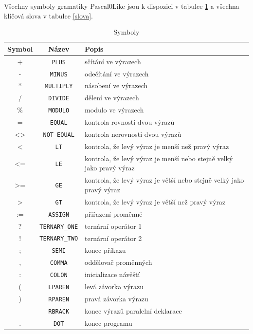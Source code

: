 \documentclass[
12pt,
a4paper,
pdftex,
czech,
titlepage
]{report}
\begin{document}
Všechny symboly gramatiky Pascal0Like jsou k dispozici v tabulce \ref{symboly} a všechna klíčová slova v tabulce \ref{slova}.

\begin{longtable}{|c|c|p{8cm}|}
\caption{Symboly}
\label{symboly}
\endfirsthead
\endhead
\hline
		\textbf{Symbol} & \textbf{Název} & \textbf{Popis} \\
\hline
+ & \texttt{PLUS} & sčítání ve výrazech \\ \hline
- & \texttt{MINUS} & odečítání ve výrazech \\ \hline
* & \texttt{MULTIPLY} & násobení ve výrazech \\ \hline
/ & \texttt{DIVIDE} & dělení ve výrazech \\ \hline
\% & \texttt{MODULO} & modulo ve výrazech \\ \hline
= & \texttt{EQUAL} &  kontrola rovnosti dvou výrazů \\ \hline
<> & \texttt{NOT\_EQUAL} & kontrola nerovnosti dvou výrazů \\ \hline
< & \texttt{LT} & kontrola, že levý výraz je menší než pravý výraz \\ \hline
<= & \texttt{LE} & kontrola, že levý výraz je menší nebo stejně velký jako pravý výraz \\ \hline
>= & \texttt{GE} & kontrola, že levý výraz je větší nebo stejně velký jako pravý výraz \\ \hline
> & \texttt{GT} & kontrola, že levý výraz je větší než pravý výraz \\ \hline
:= & \texttt{ASSIGN} & přiřazení proměnné \\ \hline
? & \texttt{TERNARY\_ONE} & ternární operátor 1 \\ \hline
! & \texttt{TERNARY\_TWO} & ternární operátor 2 \\ \hline
; & \texttt{SEMI} & konec příkazu \\ \hline
, & \texttt{COMMA} & oddělovač proměnných \\ \hline
: & \texttt{COLON} & inicializace návěští \\ \hline
( & \texttt{LPAREN} & levá závorka výrazu \\ \hline
) & \texttt{RPAREN} & pravá závorka výrazu \\ \hline
[ & \texttt{LBRACK} & počátek výrazů paralelní deklarace \\ \hline
] & \texttt{RBRACK} & konec výrazů paralelní deklarace \\ \hline
. & \texttt{DOT} & konec programu \\ \hline
\end{longtable}
\end{document}

